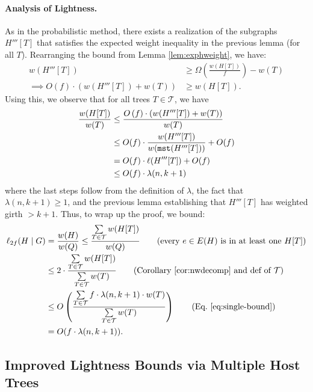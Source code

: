 \documentclass{article}
\theoremstyle{plain}
\theoremstyle{definition}
\newcommand{\mst}{\texttt{mst}}
\newcommand{\tee}{\mathcal{T}}
\begin{document}
\paragraph{Analysis of Lightness.}

As in the probabilistic method, there exists a realization of the subgraphs $H'''[T]$ that satisfies the expected weight inequality in the previous lemma (for all $T$).
Rearranging the bound from Lemma \ref{lem:exphweight}, we have:
\begin{align*}
w(H'''[T]) &\ge \Omega\left( \frac{w(H[T])}{f} \right) - w(T)\\
\implies O(f) \cdot \left(w(H'''[T]) + w(T) \right) &\ge w(H[T]).
\end{align*}
Using this, we observe that for all trees $T \in \tee$, we have 
\begin{align}
\frac{w(H[T])}{w(T)} &\le \frac{O\left(f\right) \cdot \left(w(H'''[T]) + w(T)\right)}{w(T)} \notag \\
&\le O(f) \cdot \frac{w(H'''[T])}{w(\mst(H'''[T]))} + O(f)\notag \\
&= O(f) \cdot \ell(H'''[T]) + O(f)\notag \\ 
&\le O(f) \cdot \lambda(n, k+1) \label{eq:single-bound}
\end{align}
where the last steps follow from the definition of $\lambda$, the fact that $\lambda(n, k+1) \ge 1$, and the previous lemma establishing that $H'''[T]$ has weighted girth $>k+1$.
Thus, to wrap up the proof, we bound:
\begin{align*}
\ell_{2f}(H \mid G) &= \frac{w(H)}{w(Q)} \leq \frac{\sum \limits_{T \in \tee} w(H[T])}{w(Q)} \tag{every $e \in E(H)$ is in at least one $H[T]$} \\ 
&\leq 2 \cdot \frac{\sum \limits_{T \in \tee} w(H[T])}{\sum \limits_{T \in \tee} w(T)} \tag{Corollary~\ref{cor:nwdecomp} and def of $\tee$}\\
&\le  O\left( \frac{\sum \limits_{T \in \tee} f \cdot \lambda(n, k+1) \cdot w(T)}{\sum \limits_{T \in \tee} w(T)} \right) \tag{Eq.~\eqref{eq:single-bound}}\\
&= O(f \cdot \lambda(n, k+1)).
\end{align*}

\subsection{Improved Lightness Bounds via Multiple Host Trees} \label{sec:multiple-host}
\end{document}
